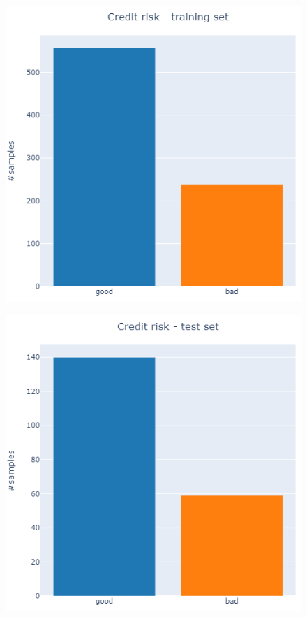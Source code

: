 \documentclass[letterpaper]{article}
\begin{document}
	\begin{figure}
		\centering
		\begin{minipage}[c]{0.40\textwidth}
			\includegraphics[width=\textwidth]{images/training_set.png}
			\label{fig:9}
		\end{minipage}
		\begin{minipage}{0.05\textwidth}
			\quad
		\end{minipage}
		\begin{minipage}[c]{0.40\textwidth}
			\includegraphics[width=\textwidth]{images/test_set.png}
			\label{fig:10}
		\end{minipage}
	\end{figure}
	
\end{document}
